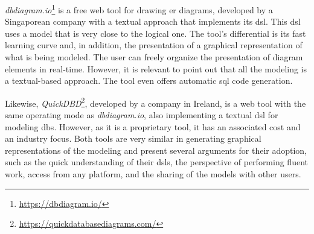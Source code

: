 \textit{dbdiagram.io}\footnote{\url{https://dbdiagram.io/}} is a free web tool for drawing \ac{er} diagrams, developed by a Singaporean company with a textual approach that implements its \ac{dsl}.
This \ac{dsl} uses a model that is very close to the logical one.
The tool's differential is its fast learning curve and, in addition, the presentation of a graphical representation of what is being modeled.
The user can freely organize the presentation of diagram elements in real-time.
However,  it is relevant to point out that all the modeling is a textual-based approach.
The tool even offers automatic \ac{sql} code generation.

Likewise, \textit{QuickDBD}\footnote{\url{https://quickdatabasediagrams.com/}}, developed by a company in Ireland, is a web tool with the same operating mode as \textit{dbdiagram.io}, also implementing a textual \ac{dsl} for modeling \acp{db}.
However, as it is a proprietary tool, it has an associated cost and an industry focus.
Both tools are very similar in generating graphical representations of the modeling and present several arguments for their adoption, such as the quick understanding of their \acp{dsl}, the perspective of performing fluent work, access from any platform, and the sharing of the models with other users.

